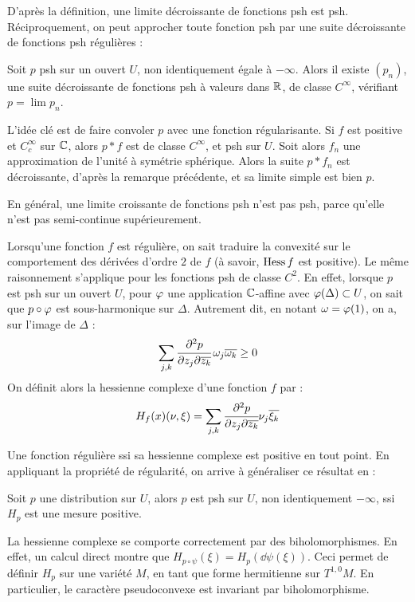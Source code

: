 D'après la définition, une limite décroissante de fonctions psh est psh. Réciproquement, on peut approcher toute fonction psh par une suite décroissante de fonctions psh régulières :
\begin{prop}
	Soit $p$ psh sur un ouvert $U$, non identiquement égale à $-\infty$. Alors il existe $(p_n)$, une suite décroissante de fonctions psh à valeurs dans $\mathbb{R}$, de classe $C^{\infty}$, vérifiant $p=\lim p_n$.
\end{prop}
\begin{preuve}
	L'idée clé est de faire convoler $p$ avec une fonction régularisante. Si $f$ est positive et $C^{\infty}_c$ sur $\mathbb{C}$, alors $p * f$ est de classe $C^{\infty}$, et psh sur $U$.
	Soit alors $f_n$ une approximation de l'unité à symétrie sphérique. Alors la suite $p * f_n$ est décroissante, d'après la remarque précédente, et sa limite simple est bien $p$.
\end{preuve}
En général, une limite croissante de fonctions psh n'est pas psh, parce qu'elle n'est pas semi-continue supérieurement.

Lorsqu'une fonction $f$ est régulière, on sait traduire la convexité sur le comportement des dérivées d'ordre $2$ de $f$ (à savoir, $\operatorname{Hess} f$ est positive). Le même raisonnement s'applique pour les fonctions psh de classe $C^2$. En effet, lorsque $p$ est psh sur un ouvert $U$, pour $\varphi$ une application $\mathbb{C}$-affine avec $\varphi(\Delta) \subset U$, on sait que $p \circ \varphi$ est sous-harmonique sur $\Delta$. Autrement dit, en notant $\omega = \varphi(1)$, on a, sur l'image de $\Delta$ :
\begin{equation*}
	\sum_{j,k} \cfrac{\partial^2 p}{\partial z_j\partial\overline{z_k}}\,\omega_j\overline{\omega_k} \geq 0
\end{equation*}
On définit alors la hessienne complexe d'une fonction $f$ par :
\begin{equation*}
	H_f(x)(\nu,\xi) = \sum_{j,k}\cfrac{\partial^2p}{\partial z_j\partial \overline{z_k}}\nu_j\overline{\xi_k}
\end{equation*}

Une fonction régulière ssi sa hessienne complexe est positive en tout point. En appliquant la propriété de régularité, on arrive à généraliser ce résultat en :
\begin{prop}
	Soit $p$ une distribution sur $U$, alors $p$ est psh sur $U$, non identiquement $-\infty$, ssi $H_p$ est une mesure positive.
\end{prop}

La hessienne complexe se comporte correctement par des biholomorphismes. En effet, un calcul direct montre que $H_{p\circ \psi}(\xi)=H_p(\dd\psi(\xi))$. Ceci permet de définir $H_p$ sur une variété $M$, en tant que forme hermitienne sur $T^{1,0}M$. En particulier, le caractère pseudoconvexe est invariant par biholomorphisme.

